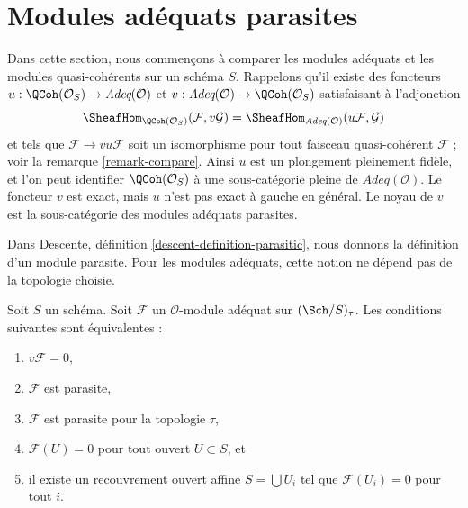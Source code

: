 \section{Modules adéquats parasites}
\label{section-parasitic}

\noindent
Dans cette section, nous commençons à comparer les modules adéquats et les modules
quasi-cohérents sur un schéma $S$. Rappelons qu'il existe des foncteurs
$u : \QCoh(\mathcal{O}_S) \to \textit{Adeq}(\mathcal{O})$
et
$v : \textit{Adeq}(\mathcal{O}) \to \QCoh(\mathcal{O}_S)$
satisfaisant à l'adjonction
$$
\SheafHom_{\QCoh(\mathcal{O}_S)}(\mathcal{F}, v\mathcal{G})
=
\SheafHom_{\textit{Adeq}(\mathcal{O})}(u\mathcal{F}, \mathcal{G})
$$
et tels que $\mathcal{F} \to vu\mathcal{F}$ soit un isomorphisme pour
tout faisceau quasi-cohérent $\mathcal{F}$ ; voir la
remarque \ref{remark-compare}.
Ainsi $u$ est un plongement pleinement fidèle, et l'on peut identifier
$\QCoh(\mathcal{O}_S)$ à une sous-catégorie pleine de
$\textit{Adeq}(\mathcal{O})$.
Le foncteur $v$ est exact, mais $u$ n'est pas exact à gauche en général.
Le noyau de $v$ est la sous-catégorie des modules adéquats parasites.

\medskip\noindent
Dans Descente, définition \ref{descent-definition-parasitic},
nous donnons la définition d'un module parasite.
Pour les modules adéquats, cette notion ne dépend pas
de la topologie choisie.

\begin{lemma}
\label{lemma-parasitic-adequate}
Soit $S$ un schéma.
Soit $\mathcal{F}$ un $\mathcal{O}$-module adéquat sur
$(\Sch/S)_\tau$. Les conditions suivantes sont équivalentes :
\begin{enumerate}
\item $v\mathcal{F} = 0$,
\item $\mathcal{F}$ est parasite,
\item $\mathcal{F}$ est parasite pour la topologie $\tau$,
\item $\mathcal{F}(U) = 0$ pour tout ouvert $U \subset S$, et
\item il existe un recouvrement ouvert affine $S = \bigcup U_i$
tel que $\mathcal{F}(U_i) = 0$ pour tout $i$.
\end{enumerate}
\end{lemma}

